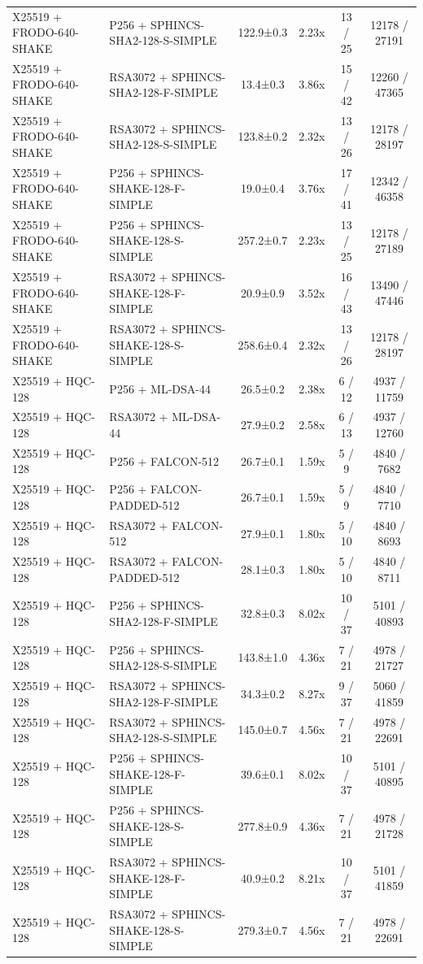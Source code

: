 \documentclass[10pt]{article}
\begin{document}
\begin{tabular}{@{}l l c c c c@{}}
X25519 + FRODO-640-SHAKE & P256 + SPHINCS-SHA2-128-S-SIMPLE & 122.9±0.3 & 2.23x & 13 / 25 & 12178 / 27191 \\
X25519 + FRODO-640-SHAKE & RSA3072 + SPHINCS-SHA2-128-F-SIMPLE & 13.4±0.3 & 3.86x & 15 / 42 & 12260 / 47365 \\
X25519 + FRODO-640-SHAKE & RSA3072 + SPHINCS-SHA2-128-S-SIMPLE & 123.8±0.2 & 2.32x & 13 / 26 & 12178 / 28197 \\
X25519 + FRODO-640-SHAKE & P256 + SPHINCS-SHAKE-128-F-SIMPLE & 19.0±0.4 & 3.76x & 17 / 41 & 12342 / 46358 \\
X25519 + FRODO-640-SHAKE & P256 + SPHINCS-SHAKE-128-S-SIMPLE & 257.2±0.7 & 2.23x & 13 / 25 & 12178 / 27189 \\
X25519 + FRODO-640-SHAKE & RSA3072 + SPHINCS-SHAKE-128-F-SIMPLE & 20.9±0.9 & 3.52x & 16 / 43 & 13490 / 47446 \\
X25519 + FRODO-640-SHAKE & RSA3072 + SPHINCS-SHAKE-128-S-SIMPLE & 258.6±0.4 & 2.32x & 13 / 26 & 12178 / 28197 \\
X25519 + HQC-128 & P256 + ML-DSA-44 & 26.5±0.2 & 2.38x & 6 / 12 & 4937 / 11759 \\
X25519 + HQC-128 & RSA3072 + ML-DSA-44 & 27.9±0.2 & 2.58x & 6 / 13 & 4937 / 12760 \\
X25519 + HQC-128 & P256 + FALCON-512 & 26.7±0.1 & 1.59x & 5 / 9 & 4840 / 7682 \\
X25519 + HQC-128 & P256 + FALCON-PADDED-512 & 26.7±0.1 & 1.59x & 5 / 9 & 4840 / 7710 \\
X25519 + HQC-128 & RSA3072 + FALCON-512 & 27.9±0.1 & 1.80x & 5 / 10 & 4840 / 8693 \\
X25519 + HQC-128 & RSA3072 + FALCON-PADDED-512 & 28.1±0.3 & 1.80x & 5 / 10 & 4840 / 8711 \\
X25519 + HQC-128 & P256 + SPHINCS-SHA2-128-F-SIMPLE & 32.8±0.3 & 8.02x & 10 / 37 & 5101 / 40893 \\
X25519 + HQC-128 & P256 + SPHINCS-SHA2-128-S-SIMPLE & 143.8±1.0 & 4.36x & 7 / 21 & 4978 / 21727 \\
X25519 + HQC-128 & RSA3072 + SPHINCS-SHA2-128-F-SIMPLE & 34.3±0.2 & 8.27x & 9 / 37 & 5060 / 41859 \\
X25519 + HQC-128 & RSA3072 + SPHINCS-SHA2-128-S-SIMPLE & 145.0±0.7 & 4.56x & 7 / 21 & 4978 / 22691 \\
X25519 + HQC-128 & P256 + SPHINCS-SHAKE-128-F-SIMPLE & 39.6±0.1 & 8.02x & 10 / 37 & 5101 / 40895 \\
X25519 + HQC-128 & P256 + SPHINCS-SHAKE-128-S-SIMPLE & 277.8±0.9 & 4.36x & 7 / 21 & 4978 / 21728 \\
X25519 + HQC-128 & RSA3072 + SPHINCS-SHAKE-128-F-SIMPLE & 40.9±0.2 & 8.21x & 10 / 37 & 5101 / 41859 \\
X25519 + HQC-128 & RSA3072 + SPHINCS-SHAKE-128-S-SIMPLE & 279.3±0.7 & 4.56x & 7 / 21 & 4978 / 22691 \\
\bottomrule
\end{tabular}
\end{document}
